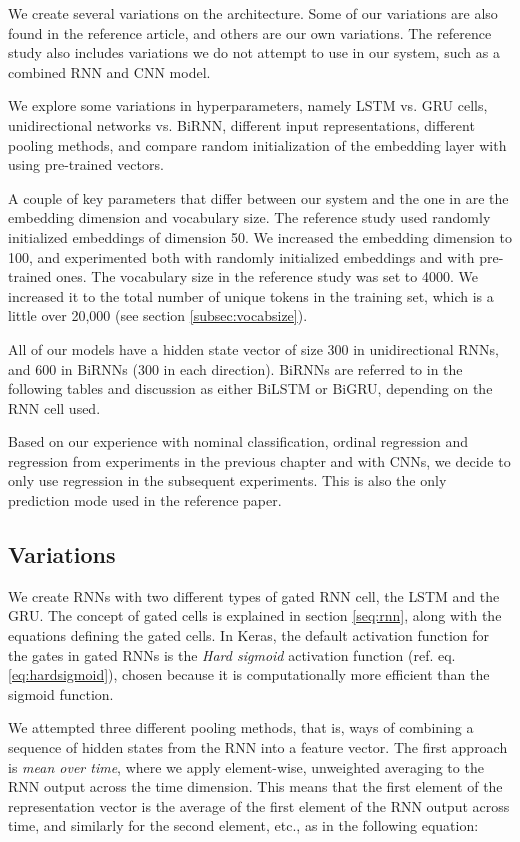 We create several variations on the architecture. Some of our variations are
also found in the reference article, and others are our own variations. The
reference study also includes variations we do not attempt to use in our
system, such as a combined \ac{RNN} and \ac{CNN} model.

We explore some variations in hyperparameters, namely LSTM vs. GRU cells,
unidirectional networks vs. BiRNN, different input representations, different
pooling methods, and compare random initialization of the embedding layer
with using pre-trained vectors.

A couple of key parameters that differ between our system and the one in
\textcite{taghipour16} are the embedding dimension and vocabulary size. The
reference study used randomly initialized embeddings of dimension 50. We
increased the embedding dimension to 100, and experimented both with randomly
initialized embeddings and with pre-trained ones. The vocabulary size in the
reference study was set to 4000. We increased it to the total number of
unique tokens in the training set, which is a little over 20,000 (see section
\ref{subsec:vocabsize}).

All of our models have a hidden state vector of size 300 in unidirectional
\acp{RNN}, and 600 in BiRNNs (300 in each direction). BiRNNs are referred to
in the following tables and discussion as either BiLSTM or BiGRU, depending
on the RNN cell used.

Based on our experience with nominal classification, ordinal regression and
regression from experiments in the previous chapter and with \acp{CNN}, we
decide to only use regression in the subsequent experiments. This is also the
only prediction mode used in the reference paper.


\subsection{Variations}

We create \acp{RNN} with two different types of gated \ac{RNN} cell, the
\ac{LSTM} and the \ac{GRU}. The concept of gated cells is explained in
section \ref{seq:rnn}, along with the equations defining the gated cells. In
Keras, the default activation function for the gates in gated RNNs is the
\emph{Hard sigmoid} activation function (ref. eq. \ref{eq:hardsigmoid}),
chosen because it is computationally more efficient than the sigmoid
function.

We attempted three different pooling methods, that is, ways of combining a
sequence of hidden states from the \ac{RNN} into a feature vector. The first
approach is \emph{mean over time}, where we apply element-wise, unweighted
averaging to the RNN output across the time dimension. This means that the
first element of the representation vector is the average of the first
element of the RNN output across time, and similarly for the second element,
etc., as in the following equation:

